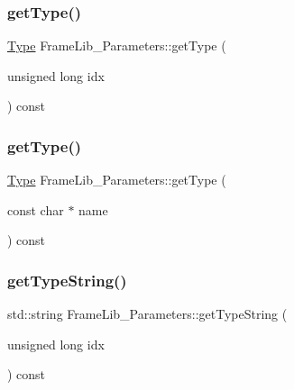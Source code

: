 \mbox{\label{class_frame_lib___parameters_ae81f3bf43c6301b1abadd5b2539f8925}} 
\subsubsection{\texorpdfstring{get\+Type()}{getType()}\hspace{0.1cm}{\footnotesize\ttfamily [1/2]}}
{\footnotesize\ttfamily \hyperlink{class_frame_lib___parameters_a01bd45aaa25fa8cfaec369e2c8a8371a}{Type} Frame\+Lib\+\_\+\+Parameters\+::get\+Type (\begin{DoxyParamCaption}\item[{unsigned long}]{idx }\end{DoxyParamCaption}) const\hspace{0.3cm}{\ttfamily [inline]}}

\mbox{\label{class_frame_lib___parameters_a705bba592b790d1b884b2ea4dd4bdbd4}} 
\subsubsection{\texorpdfstring{get\+Type()}{getType()}\hspace{0.1cm}{\footnotesize\ttfamily [2/2]}}
{\footnotesize\ttfamily \hyperlink{class_frame_lib___parameters_a01bd45aaa25fa8cfaec369e2c8a8371a}{Type} Frame\+Lib\+\_\+\+Parameters\+::get\+Type (\begin{DoxyParamCaption}\item[{const char $\ast$}]{name }\end{DoxyParamCaption}) const\hspace{0.3cm}{\ttfamily [inline]}}

\mbox{\label{class_frame_lib___parameters_a75457679ab4b67d5d438bf8619544d94}} 
\subsubsection{\texorpdfstring{get\+Type\+String()}{getTypeString()}\hspace{0.1cm}{\footnotesize\ttfamily [1/2]}}
{\footnotesize\ttfamily std\+::string Frame\+Lib\+\_\+\+Parameters\+::get\+Type\+String (\begin{DoxyParamCaption}\item[{unsigned long}]{idx }\end{DoxyParamCaption}) const}

